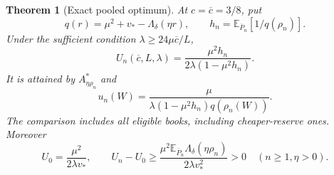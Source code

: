 \documentclass[11pt,a4paper]{amsart}
\theoremstyle{plain}
\newtheorem{theorem}{Theorem}[section]
\theoremstyle{definition}
\theoremstyle{remark}
\newcommand{\EE}{\mathbb{E}}
\newcommand{\Ebar}{\EE_{\overline P_n}}
\begin{document}
\begin{theorem}[Exact pooled optimum]\label{thm:pooled}
At $c=\overline c=3/8$, put
\[
 q(r)=\mu^2+v_*-\Lambda_\delta(\eta r),\qquad
 h_n=\Ebar[1/q(\rho_n)].
\]
Under the sufficient condition $\lambda\ge24\mu\overline c/L$,
\begin{equation}\label{eq:pooledvalue}
 U_n(\overline c,L,\lambda)
 =\frac{\mu^2h_n}{2\lambda(1-\mu^2h_n)}.
\end{equation}
It is attained by $A_{\eta\rho_n}^*$ and
\begin{equation}\label{eq:inversesize}
 u_n(W)=\frac{\mu}{\lambda(1-\mu^2h_n)q(\rho_n(W))}.
\end{equation}
The comparison includes all eligible books, including cheaper-reserve ones. Moreover
\begin{equation}\label{eq:pooledgain}
 U_0=\frac{\mu^2}{2\lambda v_*},\qquad
 U_n-U_0\ge\frac{\mu^2\Ebar\Lambda_\delta(\eta\rho_n)}{2\lambda v_*^2}>0
 \quad(n\ge1,\eta>0).
\end{equation}
\end{theorem}
\end{document}
